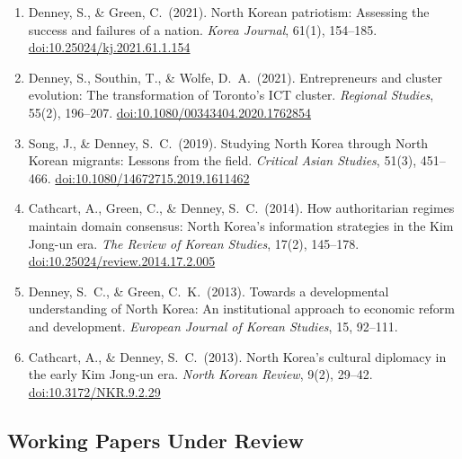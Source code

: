 \documentclass[11pt, a4paper]{article}
\begin{document}
\begin{enumerate}[itemsep=0.15em]
  \item Denney, S., \& Green, C.\ (2021). North Korean patriotism: Assessing the success and failures of a nation. \textit{Korea Journal}, 61(1), 154--185. \href{https://doi.org/10.25024/kj.2021.61.1.154}{doi:10.25024/kj.2021.61.1.154}

  \item Denney, S., Southin, T., \& Wolfe, D.\ A.\ (2021). Entrepreneurs and cluster evolution: The transformation of Toronto's ICT cluster. \textit{Regional Studies}, 55(2), 196--207. \href{https://doi.org/10.1080/00343404.2020.1762854}{doi:10.1080/00343404.2020.1762854}

  \item Song, J., \& Denney, S.\ C.\ (2019). Studying North Korea through North Korean migrants: Lessons from the field. \textit{Critical Asian Studies}, 51(3), 451--466. \href{https://doi.org/10.1080/14672715.2019.1611462}{doi:10.1080/14672715.2019.1611462}

  \item Cathcart, A., Green, C., \& Denney, S.\ C.\ (2014). How authoritarian regimes maintain domain consensus: North Korea's information strategies in the Kim Jong-un era. \textit{The Review of Korean Studies}, 17(2), 145--178. \href{https://doi.org/10.25024/review.2014.17.2.005}{doi:10.25024/review.2014.17.2.005}

  \item Denney, S.\ C., \& Green, C.\ K.\ (2013). Towards a developmental understanding of North Korea: An institutional approach to economic reform and development. \textit{European Journal of Korean Studies}, 15, 92--111.

  \item Cathcart, A., \& Denney, S.\ C.\ (2013). North Korea's cultural diplomacy in the early Kim Jong-un era. \textit{North Korean Review}, 9(2), 29--42. \href{https://doi.org/10.3172/NKR.9.2.29}{doi:10.3172/NKR.9.2.29}
\end{enumerate}

\subsection{Working Papers Under Review}
\end{document}
